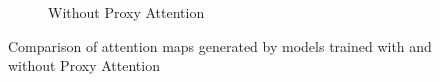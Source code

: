 \begin{figure}[H]
\begin{subfigure}[b]{.7\textwidth}
        \caption{Without Proxy Attention}
        \label{fig:noproxy3}
    \end{subfigure}
    \caption{Comparison of attention maps generated by models trained with and without Proxy Attention}
    \label{fig:attention3}
\end{figure}

